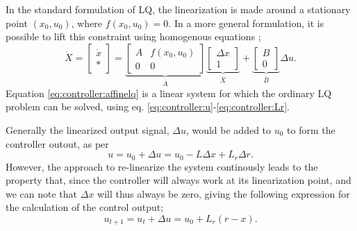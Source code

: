     In the standard formulation of LQ, the linearization is made
    around a stationary point $(x_{0},u_{0})$, where $f(x_{0},u_{0}) = 0$.
    In a more general formulation, it is possible to lift this constraint
    using homogenous equations \citep{Rantzer99piecewiselinear};
    \begin{equation}
    \label{eq:controller:affinelq}
        \dot{X} = \left[
        \begin{array}{c}
            \dot{x} \\
            \ast
        \end{array}\right] =
        \underbrace{\left[
        \begin{array}{cc}
            A & f(x_{0},u_{0}) \\
            0 & 0
        \end{array}\right]}_{\bar{A}}
        \underbrace{\left[
        \begin{array}{c}
            \Delta x \\
            1
        \end{array}\right]}_{\bar{X}}
        +
        \underbrace{\left[
        \begin{array}{c}
            B \\
            0
        \end{array}\right]}_{\bar{B}}
        \Delta u.
    \end{equation}
    Equation \ref{eq:controller:affinelq} is a linear system for which
    the ordinary LQ problem can be solved, using eq.
    \eqref{eq:controller:u}-\eqref{eq:controller:Lr}.

    Generally the linearized output signal, $\Delta u$, would be added
    to $u_{0}$ to form the controller outout, as per
    \begin{equation*}
        u = u_{0} + \Delta u = u_{0} -L\Delta x + L_{r}\Delta r.
    \end{equation*}
    However, the approach to re-linearize the system continously
    leads to the property that, since the controller will always work
    at its linearization point, and we can note that $\Delta x$ will
    thus always be zero, giving the following expression for the
    calculation of the control output;
    \begin{equation}
        u_{t+1} = u_{t} + \Delta u = u_{0} + L_{r}(r-x).
    \end{equation}
